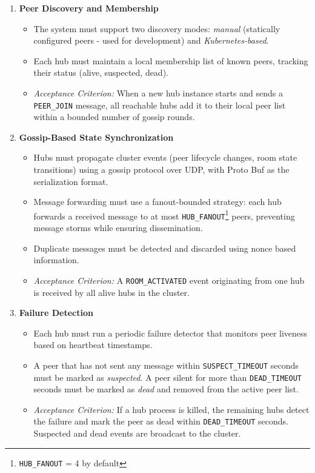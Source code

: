 \begin{enumerate}
    \item \textbf{Peer Discovery and Membership}
    \begin{itemize}
        \item The system must support two discovery modes: \textit{manual} (statically configured peers - used for development) and \textit{Kubernetes-based}.
        \item Each hub must maintain a local membership list of known peers, tracking their status (alive, suspected, dead).
        \item \textit{Acceptance Criterion:} When a new hub instance starts and sends a \texttt{PEER\_JOIN} message, all reachable hubs add it to their local peer list within a bounded number of gossip rounds.
    \end{itemize}

    \item \textbf{Gossip-Based State Synchronization}
    \begin{itemize}
        \item Hubs must propagate cluster events (peer lifecycle changes, room state transitions) using a gossip protocol \cite{demers1987epidemic} over UDP, with Proto Buf as the serialization format.
        \item Message forwarding must use a fanout-bounded strategy: each hub forwards a received message to at most \texttt{HUB\_FANOUT}\footnote{\texttt{HUB\_FANOUT} = 4 by default} peers, preventing message storms while ensuring dissemination.
        \item Duplicate messages must be detected and discarded using nonce based information.
        \item \textit{Acceptance Criterion:} A \texttt{ROOM\_ACTIVATED} event originating from one hub is received by all alive hubs in the cluster.
    \end{itemize}

    \item \textbf{Failure Detection}
    \begin{itemize}
        \item Each hub must run a periodic failure detector that monitors peer liveness based on heartbeat timestamps.
        \item A peer that has not sent any message within \texttt{SUSPECT\_TIMEOUT} seconds must be marked as \textit{suspected}. A peer silent for more than \texttt{DEAD\_TIMEOUT} seconds must be marked as \textit{dead} and removed from the active peer list.
        \item \textit{Acceptance Criterion:} If a hub process is killed, the remaining hubs detect the failure and mark the peer as dead within \texttt{DEAD\_TIMEOUT} seconds. Suspected and dead events are broadcast to the cluster.
    \end{itemize}


\end{enumerate}
